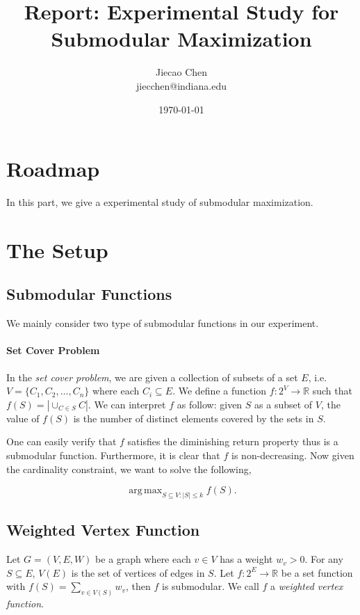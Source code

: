 \documentclass[11pt]{article}
\newcommand{\bbR}{\mathbb{R}}
\DeclareMathOperator*{\argmax}{arg\,max}
\begin{document}
\title{Report: Experimental Study for Submodular Maximization}
\author{Jiecao Chen\\ jiecchen@indiana.edu}
\date{\today}

\maketitle



\section{Roadmap}
In this part, we give a experimental study of submodular maximization. 

\section{The Setup}
\label{sec:setup}

\subsection{Submodular Functions}
We mainly consider two type of submodular functions in our experiment.
\paragraph{Set Cover Problem}
In the \emph{set cover problem}, we are given a collection of subsets of a set $E$, i.e. $V = \{C_1, C_2, \ldots, C_n\}$ where each $C_i \subseteq E$. We define a function $f:2^V \rightarrow \bbR$ such that $f(S) = |\cup_{C\in S} C|$. We can interpret $f$ as follow: given $S$ as a subset of $V$, the value of $f(S)$ is the number of distinct elements covered by the sets in $S$.

One can easily verify that $f$ satisfies the diminishing return property thus is a submodular function. Furthermore, it is clear that $f$ is non-decreasing.  Now given the cardinality constraint, we want to solve the following,

$$\argmax_{S\subseteq V: |S|\leq k} f(S).$$

\subsection{Weighted Vertex Function}
Let $G = (V, E, W)$ be a graph where each $v\in V$ has a weight $w_v > 0$. For any $S \subseteq E$, $V(E)$ is the set of vertices of edges in $S$. Let $f: 2^E \rightarrow \bbR$ be a set function with $f(S) =\sum_{v\in V(S)} w_{v}$, then $f$ is submodular. We call $f$ a \emph{weighted vertex function}.
\end{document}
